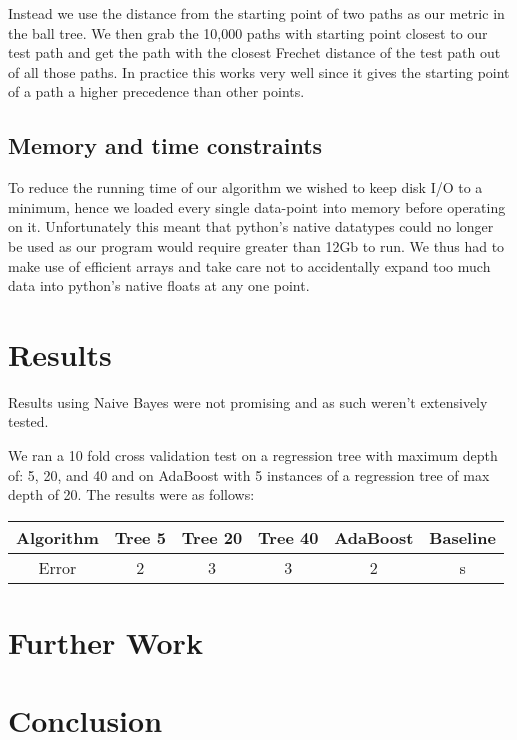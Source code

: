 \documentclass[12pt]{article}
\begin{document}
Instead we use the distance from the starting point of two paths as our metric in the ball tree. We then grab the 10,000 paths with starting point closest to our test path and get the path with the closest Frechet distance of the test path out of all those paths. In practice this works very well since it gives the starting point of a path a higher precedence than other points.
\subsection{Memory and time constraints}
To reduce the running time of our algorithm we wished to keep disk I/O to a minimum, hence we loaded every single data-point into memory before operating on it. Unfortunately this meant that python's native datatypes could no longer be used as our program would require greater than 12Gb to run. We thus had to make use of efficient arrays and take care not to accidentally expand too much data into python's native floats at any one point.

\section{Results}
Results using Naive Bayes were not promising and as such weren't extensively tested. 

We ran a 10 fold cross validation test on a regression tree with maximum depth of: 5, 20, and 40 and on AdaBoost with 5 instances of a regression tree of max depth of 20. The results were as follows:

\begin{table}
\centering
\begin{tabular}{ |c|c|c|c|c|c| }
  \hline
  Algorithm & Tree 5 & Tree 20 & Tree 40 & AdaBoost & Baseline\\ 
  \hline                      
  Error & 2 & 3 & 3&2&s \\
  \hline  
\end{tabular}
\end{table}

\section{Further Work}

\section{Conclusion}
\end{document}
